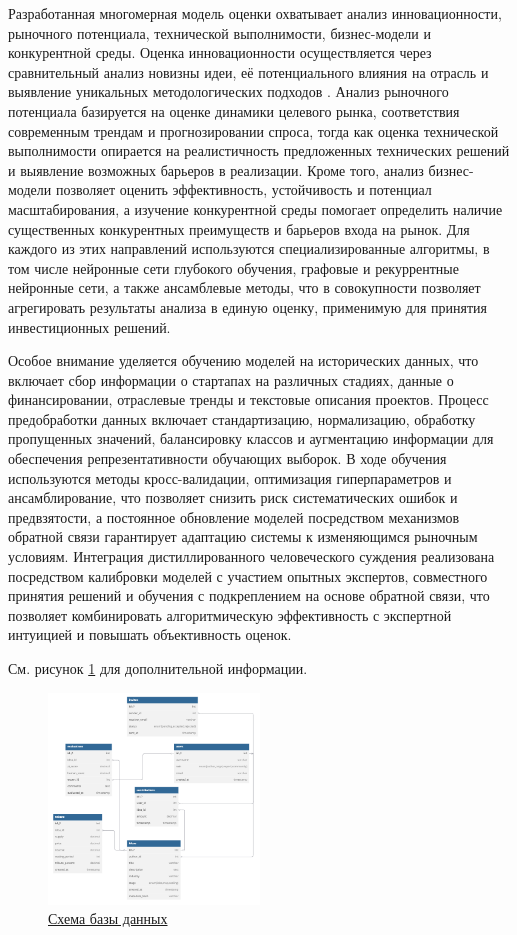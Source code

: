 \documentclass[
    14pt,
    specialist,
    candidate, %
    subf, %
    href,
    dotsinheaders=false
]{disser}
\begin{document}
Разработанная многомерная модель оценки охватывает анализ инновационности, рыночного потенциала, технической выполнимости, бизнес-модели и конкурентной среды. Оценка инновационности осуществляется через сравнительный анализ новизны идеи, её потенциального влияния на отрасль и выявление уникальных методологических подходов \cite{stanley2015greatness}. Анализ рыночного потенциала базируется на оценке динамики целевого рынка, соответствия современным трендам и прогнозировании спроса, тогда как оценка технической выполнимости опирается на реалистичность предложенных технических решений и выявление возможных барьеров в реализации. Кроме того, анализ бизнес-модели позволяет оценить эффективность, устойчивость и потенциал масштабирования, а изучение конкурентной среды помогает определить наличие существенных конкурентных преимуществ и барьеров входа на рынок. Для каждого из этих направлений используются специализированные алгоритмы, в том числе нейронные сети глубокого обучения, графовые и рекуррентные нейронные сети, а также ансамблевые методы, что в совокупности позволяет агрегировать результаты анализа в единую оценку, применимую для принятия инвестиционных решений.

Особое внимание уделяется обучению моделей на исторических данных, что включает сбор информации о стартапах на различных стадиях, данные о финансировании, отраслевые тренды и текстовые описания проектов. Процесс предобработки данных включает стандартизацию, нормализацию, обработку пропущенных значений, балансировку классов и аугментацию информации для обеспечения репрезентативности обучающих выборок. В ходе обучения используются методы кросс-валидации, оптимизация гиперпараметров и ансамблирование, что позволяет снизить риск систематических ошибок и предвзятости, а постоянное обновление моделей посредством механизмов обратной связи гарантирует адаптацию системы к изменяющимся рыночным условиям. Интеграция дистиллированного человеческого суждения реализована посредством калибровки моделей с участием опытных экспертов, совместного принятия решений и обучения с подкреплением на основе обратной связи, что позволяет комбинировать алгоритмическую эффективность с экспертной интуицией и повышать объективность оценок.

См. рисунок \ref{fig:database} для дополнительной информации.

\begin{figure}[h]
  \centering
  \includegraphics[width=0.5\textwidth]{./assets/database.png}
  \caption{{\protect\hyperlink{fig:database}{Схема базы данных}}}
  \label{fig:database}
\end{figure}
\end{document}
